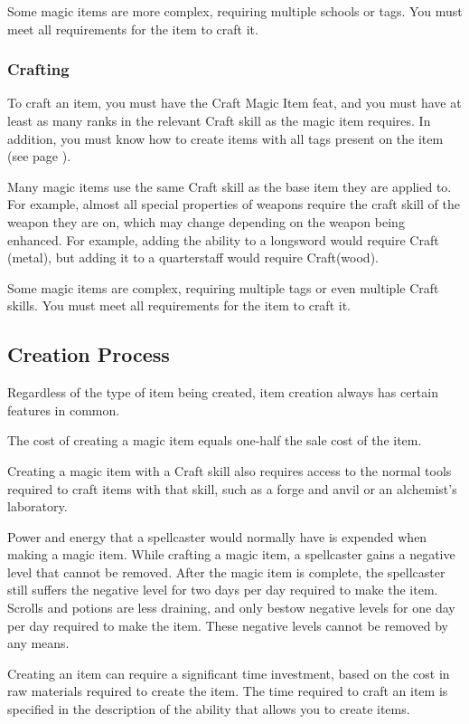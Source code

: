     Some magic items are more complex, requiring multiple schools or tags. You must meet all requirements for the item to craft it.

\subsubsection{Crafting}
    To craft an item, you must have the Craft Magic Item feat, and you must have at least as many ranks in the relevant Craft skill as the magic item requires.
    In addition, you must know how to create items with all tags present on the item (see page ).

    Many magic items use the same Craft skill as the base item they are applied to. For example, almost all special properties of weapons require the craft skill of the weapon they are on, which may change depending on the weapon being enhanced. For example, adding the  ability to a longsword would require Craft (metal), but adding it to a quarterstaff would require Craft(wood).

    Some magic items are complex, requiring multiple tags or even multiple Craft skills. You must meet all requirements for the item to craft it.

\subsection{Creation Process}
Regardless of the type of item being created, item creation always has certain features in common.

 The cost of creating a magic item equals one-half the sale cost of the item.

Creating a magic item with a Craft skill also requires access to the normal tools required to craft items with that skill, such as a forge and anvil or an alchemist's laboratory.

 Power and energy that a spellcaster would normally have is expended when making a magic item. While crafting a magic item, a spellcaster gains a negative level that cannot be removed. After the magic item is complete, the spellcaster still suffers the negative level for two days per day required to make the item. Scrolls and potions are less draining, and only bestow negative levels for one day per day required to make the item. These negative levels cannot be removed by any means.

 Creating an item can require a significant time investment, based on the cost in raw materials required to create the item. The time required to craft an item is specified in the description of the ability that allows you to create items.

